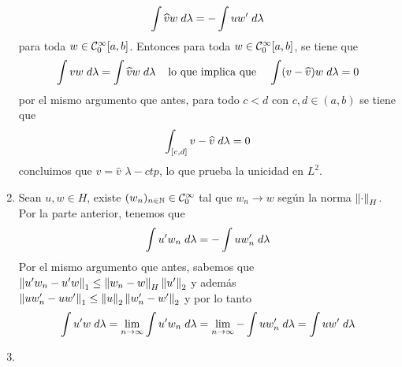 \documentclass{article}
\begin{document}
\begin{enumerate}
\begin{equation*}
        \int \widehat{v}w\hspace{1mm}d\lambda=-\int uw'\hspace{1mm}d\lambda
    \end{equation*}
    para toda $w\in\mathcal{C}_{0}^{\infty}[a,b]$. Entonces para toda $w\in\mathcal{C}_{0}^{\infty}[a,b]$, se 
    tiene que
    \begin{equation*}
        \int vw\hspace{1mm}d\lambda=\int\widehat{v}w\hspace{1mm}d\lambda
        \hspace{4mm}\text{lo que implica que}\hspace{4mm}
        \int(v-\widehat{v})w\hspace{1mm}d\lambda=0
    \end{equation*}
    por el mismo argumento que antes, para todo $c<d$ con $c,d\in(a,b)$ se tiene que
    \begin{equation*}
        \int_{[c,d]}v-\widehat{v}\hspace{1mm}d\lambda=0
    \end{equation*}
    concluimos que $v=\widehat{v}$ $\lambda-ctp$, lo que prueba la unicidad en $L^{2}$.
    
    \item Sean $u,w\in H$, existe $(w_{n})_{n\in\mathbb{N}}\in\mathcal{C}_{0}^{\infty}$ tal que $w_{n}\to w$ según 
    la norma $\left \lVert \cdot\right \rVert_{H}$. Por la parte anterior, tenemos que
    \begin{equation*}
        \int u'w_{n}\hspace{1mm}d\lambda=-\int uw_{n}'\hspace{1mm}d\lambda
    \end{equation*}
    Por el mismo argumento que antes, sabemos que $\left \lVert u'w_{n}-u'w\right \rVert_{1}\leq\left \lVert w_{n}-w\right \rVert_{H}
    \left \lVert u'\right \rVert_{2}$ y además $\left \lVert uw_{n}'-uw'\right \rVert_{1}\leq\left \lVert u\right \rVert_{2}\left \lVert w_{n}'-w'\right \rVert_{2}$ y por lo 
    tanto
    \begin{equation*}
        \int u'w\hspace{1mm}d\lambda=\lim\limits_{n\to\infty}\int u'w_{n}\hspace{1mm}d\lambda
        =\lim\limits_{n\to\infty}-\int uw_{n}'\hspace{1mm}d\lambda=\int uw'\hspace{1mm}d\lambda
    \end{equation*}
    
    \item 
\end{enumerate}

\end{document}
